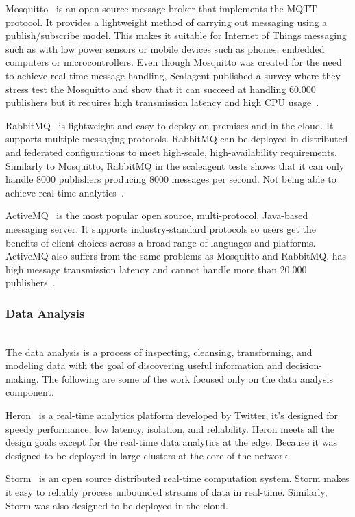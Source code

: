 Mosquitto~\cite{mosquitto} is an open source message broker that implements the MQTT protocol. It provides a lightweight method of carrying out messaging using a publish/subscribe model. This makes it suitable for Internet of Things messaging such as with low power sensors or mobile devices such as phones, embedded computers or microcontrollers. Even though Mosquitto was created for the need to achieve real-time message handling, Scalagent published a survey where they stress test the Mosquitto and show that it can succeed at handling 60.000 publishers but it requires high transmission latency and high CPU usage~\cite{mqtt}.

RabbitMQ~\cite{RabbitMQ} is lightweight and easy to deploy on-premises and in the cloud. It supports multiple messaging protocols. RabbitMQ can be deployed in distributed and federated configurations to meet high-scale, high-availability requirements. Similarly to Mosquitto, RabbitMQ in the scaleagent tests shows that it can only handle 8000 publishers producing 8000 messages per second. Not being able to achieve real-time analytics~\cite{mqtt}.

ActiveMQ~\cite{HiveMQ} is the most popular open source, multi-protocol, Java-based messaging server. It supports industry-standard protocols so users get the benefits of client choices across a broad range of languages and platforms. ActiveMQ also suffers from the same problems as Mosquitto and RabbitMQ, has high message transmission latency and cannot handle more than 20.000 publishers~\cite{mqtt}.

\subsubsection{Data Analysis}
\hfill\\
The data analysis is a process of inspecting, cleansing, transforming, and modeling data with the goal of discovering useful information and decision-making. The following are some of the work focused only on the data analysis component.

Heron~\cite{heron} is a real-time analytics platform developed by Twitter, it's designed for speedy performance, low latency, isolation, and reliability. Heron meets all the design goals except for the real-time data analytics at the edge. Because it was designed to be deployed in large clusters at the core of the network.

Storm~\cite{storm} is an open source distributed real-time computation system. Storm makes it easy to reliably process unbounded streams of data in real-time. Similarly, Storm was also designed to be deployed in the cloud.

